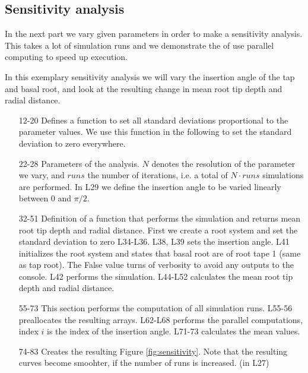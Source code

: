 \subsection{Sensitivity analysis} \label{ssec:sensitivity}

In the next part we vary given parameters in order to make a sensitivity analysis. This takes a lot of simulation runs and we demonstrate the of use parallel computing to speed up execution.

In this exemplary sensitivity analysis we will vary the insertion angle of the tap and basal root, and look at the resulting change in mean root tip depth and radial distance. 



\begin{itemize}

\item[12-20] Defines a function to set all standard deviations proportional to the parameter values. We use this function in the following to set the standard deviation to zero everywhere. 

\item[22-28] Parameters of the analysis. $N$ denotes the resolution of the parameter we vary, and $runs$ the number of iterations, i.e. a total of $N\cdot runs$ simulations are performed. In L29 we define the insertion angle to be varied linearly between 0 and $\pi/2$.

\item[32-51] Definition of a function that performs the simulation and returns mean root tip depth and radial distance. First we create a root system and set the standard deviation to zero L34-L36. L38, L39 sets the insertion angle. L41 initializes the root system and states that basal root are of root tape 1 (same as tap root). The False value turns of verbosity to avoid any outputs to the console. L42 performs the simulation. L44-L52 calculates the mean root tip depth and radial distance. 

\item[55-73] This section performs the computation of all simulation runs. L55-56 preallocates the resulting arrays. L62-L68 performs the parallel computations, index $i$ is the index of the insertion angle. L71-73 calculates the mean values.

\item[74-83] Creates the resulting Figure \ref{fig:sensitivity}. Note that the resulting curves become smoohter, if the number of runs is increased. (in L27)

\end{itemize}

